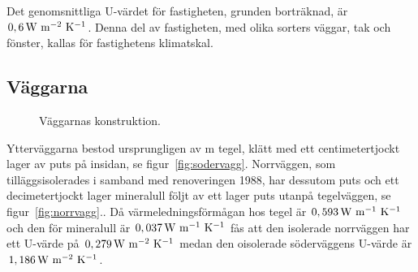 Det genomsnittliga U-värdet för fastigheten, grunden borträknad, är $\unit[0,6]{W~m^{-2}~K^{-1}}$. Denna del av fastigheten, med olika sorters väggar, tak och fönster, kallas för fastighetens klimatskal.

\subsection{Väggarna}
\label{subsec:walls}

\begin{figure}[hpbt]
\centering
{}

\caption{\label{fig:thewalls} Väggarnas konstruktion.}
\end{figure}

Ytterväggarna bestod ursprungligen av \unit[0,5]{m} tegel, klätt med ett centimetertjockt lager av puts på insidan,
se figur~\ref{fig:sodervagg}. Norrväggen, som tilläggsisolerades i samband med renoveringen 1988, har dessutom puts och ett decimetertjockt lager mineralull följt av ett lager puts utanpå tegelväggen,
se figur~\ref{fig:norrvagg}.\cite{kandidatarbete2010}\cite{petersarneo}. Då värmeledningsförmågan hos tegel är
$\unit[0,593]{W~m^{-1}~K^{-1}}$ och den för mineralull är $\unit[0,037]{W~m^{-1}~K^{-1}}$
fås att den isolerade norrväggen har ett U-värde på $\unit[0,279]{W~m^{-2}~K^{-1}}$
medan den oisolerade söderväggens U-värde är $\unit[1,186]{W~m^{-2}~K^{-1}}$.

